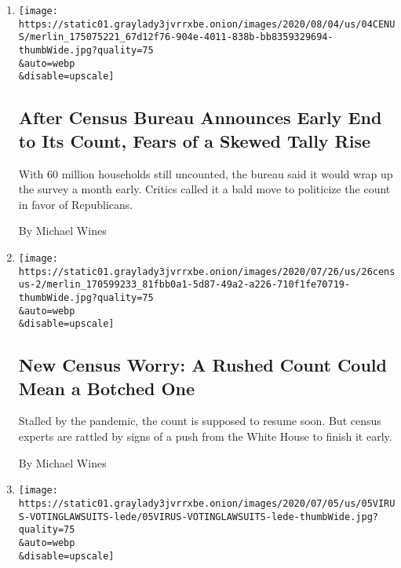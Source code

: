 \begin{enumerate}
\def\labelenumi{\arabic{enumi}.}
\item
  \href{/2020/08/04/us/2020-census-ending-early.html}{}

  \texttt{[image: https://static01.graylady3jvrrxbe.onion/images/2020/08/04/us/04CENUS/merlin\_175075221\_67d12f76-904e-4011-838b-bb8359329694-thumbWide.jpg?quality=75\\\&auto=webp\\\&disable=upscale]}

  \hypertarget{after-census-bureau-announces-early-end-to-its-count-fears-of-a-skewed-tally-rise}{%
  \subsection{After Census Bureau Announces Early End to Its Count,
  Fears of a Skewed Tally
  Rise}\label{after-census-bureau-announces-early-end-to-its-count-fears-of-a-skewed-tally-rise}}

  With 60 million households still uncounted, the bureau said it would
  wrap up the survey a month early. Critics called it a bald move to
  politicize the count in favor of Republicans.

  By Michael Wines
\item
  \href{/2020/07/28/us/trump-census.html}{}

  \texttt{[image: https://static01.graylady3jvrrxbe.onion/images/2020/07/26/us/26census-2/merlin\_170599233\_81fbb0a1-5d87-49a2-a226-710f1fe70719-thumbWide.jpg?quality=75\\\&auto=webp\\\&disable=upscale]}

  \hypertarget{new-census-worry-a-rushed-count-could-mean-a-botched-one}{%
  \subsection{New Census Worry: A Rushed Count Could Mean a Botched
  One}\label{new-census-worry-a-rushed-count-could-mean-a-botched-one}}

  Stalled by the pandemic, the count is supposed to resume soon. But
  census experts are rattled by signs of a push from the White House to
  finish it early.

  By Michael Wines
\item
  \href{/2020/07/07/us/2020-election-laws.html}{}

  \texttt{[image: https://static01.graylady3jvrrxbe.onion/images/2020/07/05/us/05VIRUS-VOTINGLAWSUITS-lede/05VIRUS-VOTINGLAWSUITS-lede-thumbWide.jpg?quality=75\\\&auto=webp\\\&disable=upscale]}

  \hypertarget{as-november-looms-so-does-the-most-litigious-election-ever}{%
}
\end{enumerate}
